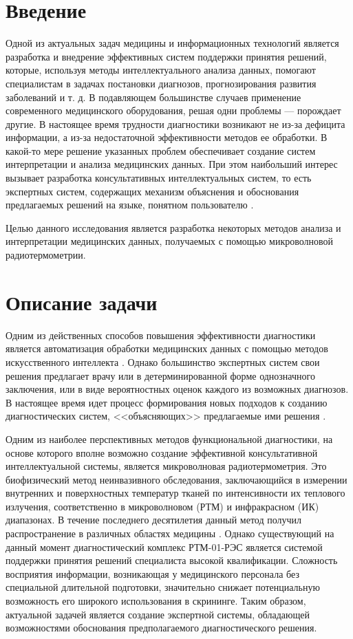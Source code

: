 \section*{Введение}

Одной из актуальных задач медицины и информационных технологий является разработка и внедрение эффективных систем поддержки принятия решений, которые, используя методы интеллектуального анализа данных, помогают специалистам в задачах постановки диагнозов, прогнозирования развития заболеваний и т. д.  В подавляющем большинстве случаев применение современного медицинского оборудования, решая одни проблемы --- порождает другие. В настоящее время трудности диагностики возникают не из-за дефицита информации, а из-за недостаточной эффективности методов ее обработки. В какой-то мере решение указанных проблем обеспечивает создание систем интерпретации и анализа медицинских данных. При этом наибольший интерес вызывает разработка консультативных интеллектуальных систем, то есть экспертных систем, содержащих механизм объяснения и обоснования предлагаемых решений на языке, понятном пользователю \cite{kobrinsky1}.

Целью данного исследования является разработка некоторых методов анализа и интерпретации медицинских данных, получаемых с помощью микроволновой радиотермометрии.

\section{Описание задачи}

Одним из действенных способов повышения эффективности диагностики является автоматизация обработки медицинских данных с помощью методов искусственного интеллекта \cite{yasnitsky,burke,kononenko1,kononenko2,lesmo}. Однако большинство экспертных систем свои решения предлагает врачу или в детерминированной форме однозначного заключения, или в виде вероятностных оценок каждого из возможных диагнозов. В настоящее время идет процесс формирования новых подходов к созданию диагностических систем, <<объясняющих>> предлагаемые ими решения \cite{kobrinsky1,kobrinsky2}.

Одним из наиболее перспективных методов функциональной диагностики, на основе которого вполне возможно создание эффективной консультативной интеллектуальной системы, является микроволновая радиотермометрия. Это биофизический метод неинвазивного обследования, заключающийся в измерении внутренних и поверхностных температур тканей по интенсивности их теплового излучения, соответственно в микроволновом (РТМ) и инфракрасном (ИК) диапазонах. В течение последнего десятилетия данный метод получил распространение в различных областях медицины \cite{losevhoperskov}. Однако существующий на данный момент диагностический комплекс РТМ-01-РЭС является системой поддержки принятия решений специалиста высокой квалификации. Сложность восприятия информации, возникающая у медицинского персонала без специальной длительной подготовки, значительно снижает потенциальную возможность его широкого использования в скрининге. Таким образом, актуальной задачей является создание экспертной системы, обладающей возможностями обоснования предполагаемого диагностического решения.

